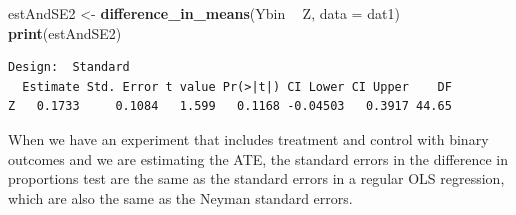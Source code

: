 \documentclass[
  12pt,
]{book}
\newenvironment{Shaded}{\begin{snugshade}}{\end{snugshade}}
\newcommand{\CommentTok}[1]{\textcolor[rgb]{0.56,0.35,0.01}{\textit{#1}}}
\newcommand{\DataTypeTok}[1]{\textcolor[rgb]{0.13,0.29,0.53}{#1}}
\newcommand{\DecValTok}[1]{\textcolor[rgb]{0.00,0.00,0.81}{#1}}
\newcommand{\FloatTok}[1]{\textcolor[rgb]{0.00,0.00,0.81}{#1}}
\newcommand{\KeywordTok}[1]{\textcolor[rgb]{0.13,0.29,0.53}{\textbf{#1}}}
\newcommand{\NormalTok}[1]{#1}
\newcommand{\OperatorTok}[1]{\textcolor[rgb]{0.81,0.36,0.00}{\textbf{#1}}}
\newcommand{\StringTok}[1]{\textcolor[rgb]{0.31,0.60,0.02}{#1}}
\theoremstyle{definition}
\theoremstyle{definition}
\theoremstyle{definition}
\theoremstyle{remark}
\begin{document}
\begin{Shaded}
\end{Shaded}

\begin{Shaded}
\begin{Highlighting}[]
\NormalTok{estAndSE2 <-}\StringTok{ }\KeywordTok{difference_in_means}\NormalTok{(Ybin }\OperatorTok{~}\StringTok{ }\NormalTok{Z, }\DataTypeTok{data =}\NormalTok{ dat1)}
\KeywordTok{print}\NormalTok{(estAndSE2)}
\end{Highlighting}
\end{Shaded}

\begin{verbatim}
Design:  Standard 
  Estimate Std. Error t value Pr(>|t|) CI Lower CI Upper    DF
Z   0.1733     0.1084   1.599   0.1168 -0.04503   0.3917 44.65
\end{verbatim}

When we have an experiment that includes treatment and control with
binary outcomes and we are estimating the ATE, the standard errors in
the difference in proportions test are the same as the standard errors
in a regular OLS regression, which are also the same as the Neyman
standard errors.
\end{document}
